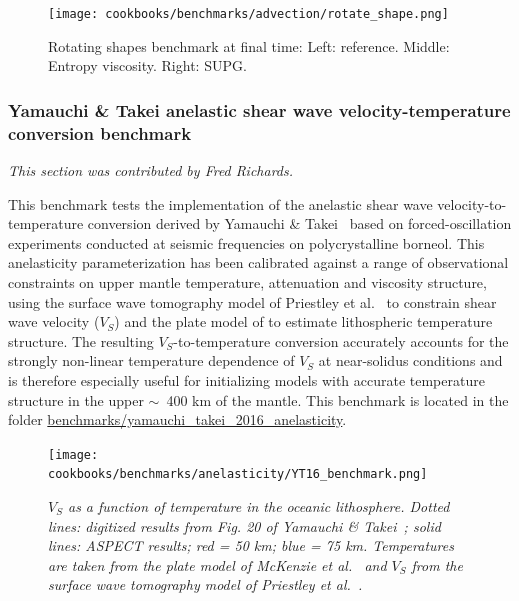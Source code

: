\documentclass{article}
\newcommand{\aspect}{\textsc{ASPECT}}
\begin{document}
\begin{figure}[t!]
  \centering
    \texttt{[image: cookbooks/benchmarks/advection/rotate\_shape.png]}%
  \caption{Rotating shapes benchmark at final time: Left: reference. Middle: Entropy viscosity. Right: SUPG.}\label{fig:benchmark-rotate-shape}
\end{figure}


\subsubsection{Yamauchi \& Takei anelastic shear wave velocity-temperature conversion benchmark}
\label{sec:benchmark-yamauchi-takei}

\textit{This section was contributed by Fred Richards.}

This benchmark tests the implementation of the anelastic shear wave velocity-to-temperature conversion derived by Yamauchi \& Takei~\cite{YT16} based on forced-oscillation experiments conducted at seismic frequencies on polycrystalline borneol. This anelasticity parameterization has been calibrated against a range of observational constraints on upper mantle temperature, attenuation and viscosity structure, using the surface wave tomography model of Priestley et al.~\cite{P12} to constrain shear wave velocity ($V_S$) and the plate model of \cite{McK05} to estimate lithospheric temperature structure. The resulting $V_S$-to-temperature conversion accurately accounts for the strongly non-linear temperature dependence of $V_S$ at near-solidus conditions and is therefore especially useful for initializing models with accurate temperature structure in the upper $\sim$~400 km of the mantle. This benchmark is located in the folder \url{benchmarks/yamauchi_takei_2016_anelasticity}.

\begin{figure}
\begin{center}
  \centering
  \texttt{[image: cookbooks/benchmarks/anelasticity/YT16\_benchmark.png]}
  \caption{\it $V_S$ as a function of temperature in the oceanic lithosphere. Dotted lines: digitized results from Fig. 20 of Yamauchi \& Takei~\cite{YT16}; solid lines: \aspect{} results; red = 50 km; blue = 75 km. Temperatures are taken from the plate model of McKenzie et al.~\cite{McK05} and $V_{S}$ from the surface wave tomography model of Priestley et al.~\cite{P12}.}  
  \label{fig:anelasticity}
\end{center}
\end{figure}
\end{document}

